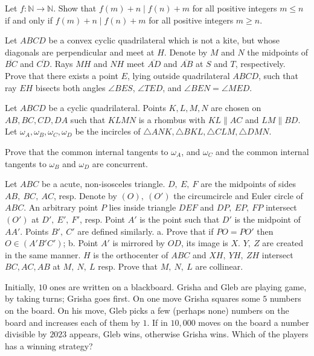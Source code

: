 \documentclass[11pt]{scrartcl}
\begin{document}
\begin{problem}[3102273497351946473]
	Let $f:\mathbb N\to \mathbb N$. Show that $f(m)+n\mid f(n)+m$ for all positive integers $m\le n$ if and only if $f(m)+n\mid f(n)+m$ for all positive integers $m\ge n$.
\end{problem}
\begin{problem}[102296866595865]
	Let $ABCD$ be a convex cyclic quadrilateral which is not a kite, but whose diagonals are perpendicular and meet at $H$. Denote by $M$ and $N$ the midpoints of $\overline{BC}$ and $\overline{CD}$. Rays $MH$ and $NH$ meet $\overline{AD}$ and $\overline{AB}$ at $S$ and $T$, respectively. Prove that there exists a point $E$, lying outside quadrilateral $ABCD$, such that
ray $EH$ bisects both angles $\angle BES$, $\angle TED$, and
$\angle BEN = \angle MED$.
\end{problem}
\begin{problem}[5299971832672937326]
Let $ABCD$ be a cyclic quadrilateral. Points $K, L, M, N$ are chosen on $AB, BC, CD, DA$ such that $KLMN$ is a rhombus with $KL \parallel AC$ and $LM \parallel BD$. Let $\omega_A, \omega_B, \omega_C, \omega_D$ be the incircles of $\triangle ANK, \triangle BKL, \triangle CLM, \triangle DMN$.

Prove that the common internal tangents to $\omega_A$, and $\omega_C$ and the common internal tangents to $\omega_B$ and $\omega_D$ are concurrent.
\end{problem}
\begin{problem}[7220404010846068686]
	Let $ABC$ be a acute, non-isosceles triangle. $D,\ E,\ F$ are the midpoints of sides $AB,\ BC,\ AC$, resp. Denote by $(O),\ (O')$ the circumcircle and Euler circle of $ABC$. An arbitrary point $P$ lies inside triangle $DEF$ and $DP,\ EP,\ FP$ intersect $(O')$ at $D',\ E',\ F'$, resp. Point $A'$ is the point such that $D'$ is the midpoint of $AA'$. Points $B',\ C'$ are defined similarly.
a. Prove that if $PO=PO'$ then $O\in(A'B'C')$;
b. Point $A'$ is mirrored by $OD$, its image is $X$. $Y,\ Z$ are created in the same manner. $H$ is the orthocenter of $ABC$ and $XH,\ YH,\ ZH$ intersect $BC, AC, AB$ at $M,\ N,\ L$ resp. Prove that $M,\ N,\ L$ are collinear.
\end{problem}
\begin{problem}[428632191392819]
Initially, $10$ ones are written on a blackboard. Grisha and Gleb are playing game, by taking turns; Grisha goes first. On one move Grisha squares some $5$ numbers on the board. On his move, Gleb picks a few (perhaps none) numbers on the board and increases each of them by $1$. If in $10,000$ moves on the board a number divisible by $2023$ appears, Gleb wins, otherwise Grisha wins. Which of the players has a winning strategy?
\end{problem}
\end{document}
